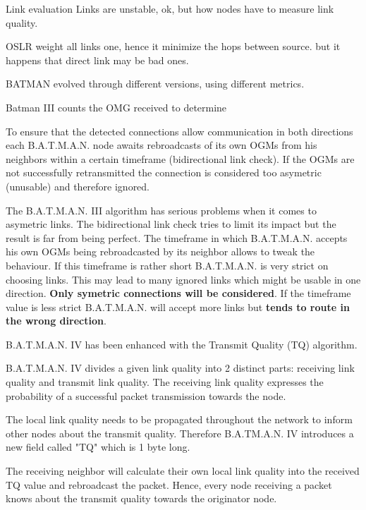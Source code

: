 \documentclass{article}
\begin{document}
\begin{frame}{Link evaluation}
Links are unstable, ok, but how nodes have to measure link quality.

OSLR weight all links one, hence it minimize the hops between source. but it happens that direct link may be bad ones.



BATMAN evolved through different versions, using different metrics.

Batman III counts the OMG received to determine 



To ensure that the detected connections allow communication in both directions each B.A.T.M.A.N. node awaits rebroadcasts of its own OGMs from his neighbors within a certain timeframe (bidirectional link check). If the OGMs are not successfully retransmitted the connection is considered too asymetric (unusable) and therefore ignored.

The B.A.T.M.A.N. III algorithm has serious problems when it comes to asymetric links. The bidirectional link check tries to limit its impact but the result is far from being perfect. The timeframe in which B.A.T.M.A.N. accepts his own OGMs being rebroadcasted by its neighbor allows to tweak the behaviour. If this timeframe is rather short B.A.T.M.A.N. is very strict on choosing links. This may lead to many ignored links which might be usable in one direction. \textbf{Only symetric connections will be considered}. If the timeframe value is less strict B.A.T.M.A.N. will accept more links but \textbf{tends to route in the wrong direction}.


 B.A.T.M.A.N. IV has been enhanced with the Transmit Quality (TQ) algorithm. 

B.A.T.M.A.N. IV divides a given link quality into 2 distinct parts: receiving link quality and transmit link quality. The receiving link quality expresses the probability of a successful packet transmission towards the node.

The local link quality needs to be propagated throughout the network to inform other nodes about the transmit quality. Therefore B.A.TM.A.N. IV introduces a new field called "TQ" which is 1 byte long.

The receiving neighbor will calculate their own local link quality into the received TQ value and rebroadcast the packet. Hence, every node receiving a packet knows about the transmit quality towards the originator node.


\end{frame}
\end{document}
